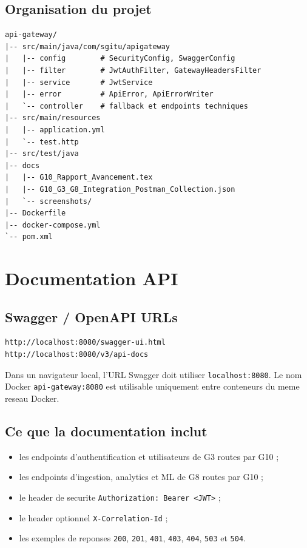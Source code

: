 \documentclass[12pt, a4paper]{article}
\begin{document}
\subsection{Organisation du projet}

\begin{lstlisting}[style=codeStyle]
api-gateway/
|-- src/main/java/com/sgitu/apigateway
|   |-- config        # SecurityConfig, SwaggerConfig
|   |-- filter        # JwtAuthFilter, GatewayHeadersFilter
|   |-- service       # JwtService
|   |-- error         # ApiError, ApiErrorWriter
|   `-- controller    # fallback et endpoints techniques
|-- src/main/resources
|   |-- application.yml
|   `-- test.http
|-- src/test/java
|-- docs
|   |-- G10_Rapport_Avancement.tex
|   |-- G10_G3_G8_Integration_Postman_Collection.json
|   `-- screenshots/
|-- Dockerfile
|-- docker-compose.yml
`-- pom.xml
\end{lstlisting}

\section{Documentation API}

\subsection{Swagger / OpenAPI URLs}

\begin{lstlisting}[style=codeStyle]
http://localhost:8080/swagger-ui.html
http://localhost:8080/v3/api-docs
\end{lstlisting}

\begin{calloutinfo}
Dans un navigateur local, l'URL Swagger doit utiliser \texttt{localhost:8080}. Le nom Docker \texttt{api-gateway:8080} est utilisable uniquement entre conteneurs du meme reseau Docker.
\end{calloutinfo}

\subsection{Ce que la documentation inclut}

\begin{itemize}
  \item les endpoints d'authentification et utilisateurs de G3 routes par G10 ;
  \item les endpoints d'ingestion, analytics et ML de G8 routes par G10 ;
  \item le header de securite \texttt{Authorization: Bearer <JWT>} ;
  \item le header optionnel \texttt{X-Correlation-Id} ;
  \item les exemples de reponses \texttt{200}, \texttt{201}, \texttt{401}, \texttt{403}, \texttt{404}, \texttt{503} et \texttt{504}.
\end{itemize}
\end{document}
